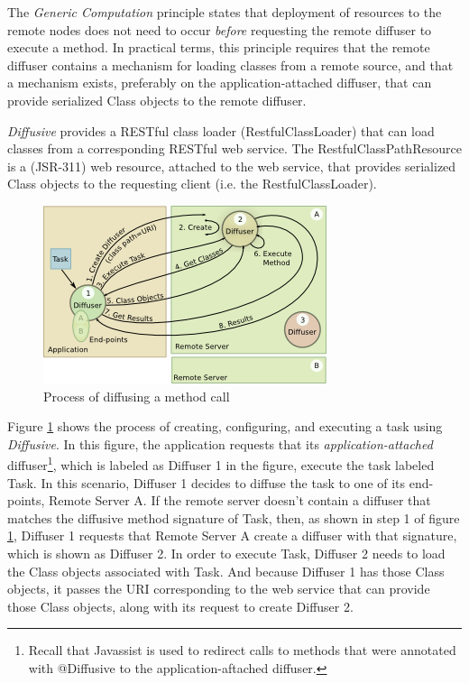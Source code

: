\documentclass[11pt]{article}
\begin{document}
The \emph{Generic Computation} principle states that deployment of resources to the remote nodes does not need to occur \emph{before} requesting the remote diffuser to execute a method. In practical terms, this principle requires that the remote diffuser contains a mechanism for loading classes from a remote source, and that a mechanism exists, preferably on the application-attached diffuser, that can provide serialized \textsf{Class} objects to the remote diffuser. 

\emph{Diffusive} provides a RESTful class loader (\textsf{RestfulClassLoader}) that can load classes from a corresponding RESTful web service. The \textsf{RestfulClassPathResource} is a (JSR-311) web resource, attached to the web service, that provides serialized \textsf{Class} objects to the requesting client (i.e. the \textsf{RestfulClassLoader}). 

\begin{figure}[htbp]
\begin{center}
\includegraphics[scale=1.1]{diffusing}
\caption{Process of diffusing a method call}
\label{fig:diffusing}
\end{center}
\end{figure}

Figure \ref{fig:diffusing} shows the process of creating, configuring, and executing a task using \emph{Diffusive}. In this figure, the application requests that its \emph{application-attached} diffuser\footnote{Recall that Javassist is used to redirect calls to methods that were annotated with \textsf{@Diffusive} to the application-aftached diffuser.}, which is labeled as \textsf{Diffuser 1} in the figure, execute the task labeled \textsf{Task}. In this scenario, \textsf{Diffuser 1} decides to diffuse the task to one of its end-points, \textsf{Remote Server A}. If the remote server doesn't contain a diffuser that matches the diffusive method signature of \textsf{Task}, then, as shown in step 1 of figure \ref{fig:diffusing}, \textsf{Diffuser 1} requests that \textsf{Remote Server A} create a diffuser with that signature, which is shown as \textsf{Diffuser 2}. In order to execute \textsf{Task}, \textsf{Diffuser 2} needs to load the \textsf{Class} objects associated with \textsf{Task}. And because \textsf{Diffuser 1} has those \textsf{Class} objects, it passes the URI corresponding to the web service that can provide those \textsf{Class} objects, along with its request to create \textsf{Diffuser 2}.
\end{document}
